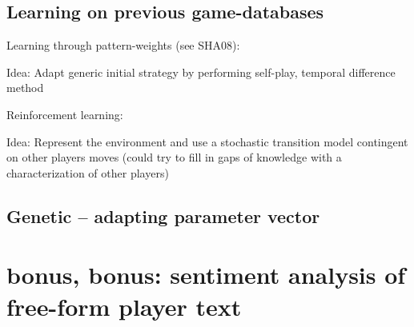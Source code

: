 \documentclass[12pt]{article}
\begin{document}
\subsection{Learning on previous game-databases}

Learning through pattern-weights (see SHA08):

  Idea: Adapt generic initial strategy by performing 
        self-play, temporal difference method

Reinforcement learning:

  Idea: Represent the environment and use a stochastic
        transition model contingent on other players
        moves (could try to fill in gaps of knowledge 
        with a characterization of other players)

  

\subsection{Genetic -- adapting parameter vector}

\section{bonus, bonus: sentiment analysis of free-form player text}
\end{document}
